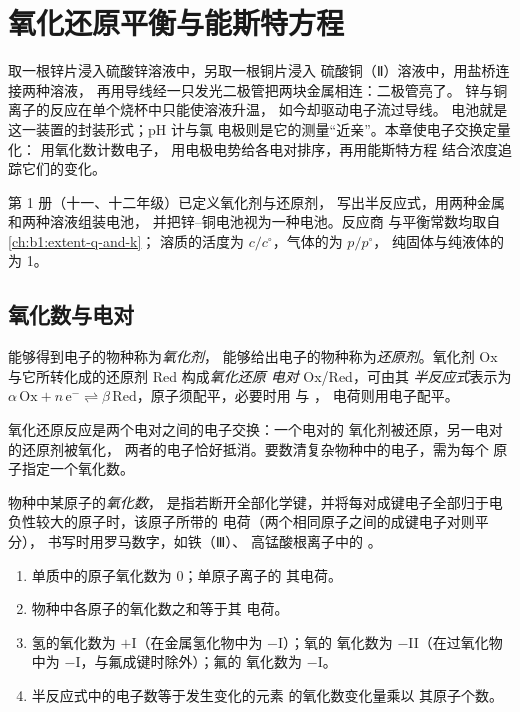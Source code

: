 \chapter{氧化还原平衡与能斯特方程}\label{ch:b1:nernst}

取一根锌片浸入硫酸锌溶液中，另取一根铜片浸入
硫酸铜（Ⅱ）溶液中，用盐桥连接两种溶液，
再用导线经一只发光二极管把两块金属相连：二极管亮了。
锌与铜离子的反应在单个烧杯中只能使溶液升温，
如今却驱动电子流过导线。
电池就是这一装置的封装形式；pH 计与氯
电极则是它的测量“近亲”。本章使电子交换定量化：
用氧化数计数电子，
用电极电势给各电对排序，再用能斯特方程
结合浓度追踪它们的变化。

\begin{recall}
第 1 册（十一、十二年级）已定义氧化剂与还原剂，
写出半反应式，用两种金属和两种溶液组装电池，
并把锌–铜电池视为一种电池。反应商
与平衡常数均取自\cref{ch:b1:extent-q-and-k}；
溶质的活度为 $c/c^\circ$，气体的为 $p/p^\circ$，
纯固体与纯液体的为 1。
\end{recall}

\section{氧化数与电对}

\begin{definition}\label{def:b1:nernst:couple}
能够得到电子的物种称为\emph{氧化剂}，
能够给出电子的物种称为\emph{还原剂}。氧化剂 Ox 与它所转化成的还原剂 Red
构成\emph{氧化还原
电对} Ox/Red，可由其
\emph{半反应式}表示为
$\alpha\,\mathrm{Ox} + n\,\mathrm{e^-} \rightleftharpoons
\beta\,\mathrm{Red}$，原子须配平，必要时用  与 ，
电荷则用电子配平。
\end{definition}

氧化还原反应是两个电对之间的电子交换：一个电对的
氧化剂被还原，另一电对的还原剂被氧化，
两者的电子恰好抵消。要数清复杂物种中的电子，需为每个
原子指定一个氧化数。

\begin{definition}[氧化数]\label{def:b1:nernst:oxidation-number}
物种中某原子的\emph{氧化数}，
是指若断开全部化学键，并将每对成键电子全部归于电负性较大的原子时，该原子所带的
电荷（两个相同原子之间的成键电子对则平分），
书写时用罗马数字，如铁（Ⅲ）、
高锰酸根离子中的 。
\end{definition}

\begin{proposition}[氧化数的规则]\label{prop:b1:nernst:on-rules}
\begin{enumerate}
  \item 单质中的原子氧化数为 0；单原子离子的
        其电荷。
  \item 物种中各原子的氧化数之和等于其
        电荷。
  \item 氢的氧化数为 $+$I（在金属氢化物中为 $-$I）；氧的
        氧化数为 $-$II（在过氧化物中为 $-$I，与氟成键时除外）；氟的
        氧化数为 $-$I。
  \item 半反应式中的电子数等于发生变化的元素
        的氧化数变化量乘以
        其原子个数。
\end{enumerate}
\end{proposition}

